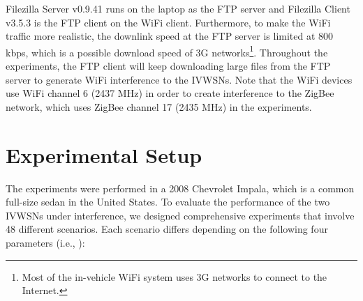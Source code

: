 \documentclass[journal]{IEEEtran}
\begin{document}
Filezilla Server v0.9.41 runs on the laptop as the FTP server and Filezilla Client v3.5.3 is the FTP client on the WiFi client. Furthermore, to make the WiFi traffic more realistic, the downlink speed at the FTP server is limited at 800 kbps, which is a possible download speed of 3G networks\footnote{Most of the in-vehicle WiFi system uses 3G networks to connect to the Internet.}. Throughout the experiments, the FTP client will keep downloading large files from the FTP server to generate WiFi interference to the IVWSNs. Note that the WiFi devices use WiFi channel 6 (2437 MHz) in order to create interference to the ZigBee network, which uses ZigBee channel 17 (2435 MHz) in the experiments.















\section{Experimental Setup}
The experiments were performed in a 2008 Chevrolet Impala, which is a common full-size sedan in the United States. To evaluate the performance of the two IVWSNs under interference, we designed comprehensive experiments that involve 48 different scenarios. Each scenario differs depending on the following four parameters (i.e., ):
\end{document}
